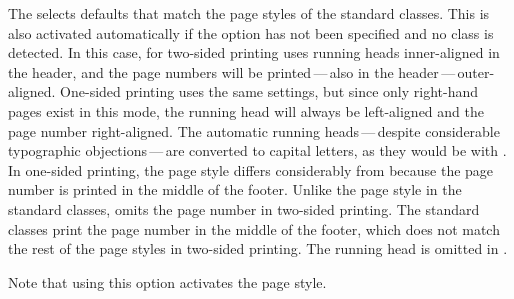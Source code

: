 The 
selects defaults that match the page styles of the standard
classes. This is also activated automatically if the option has not been
specified and no \KOMAScript{} class is detected. In this case, for two-sided
printing  uses running heads
inner-aligned in the header, and the page numbers will be printed\,---\,also
in the header\,---\,outer-aligned. One-sided printing uses the same settings,
but since only right-hand pages exist in this mode, the running head will
always be left-aligned and the page number right-aligned. The automatic
running heads\,---\,despite considerable typographic objections\,---\,are
converted to capital letters, as they would be with
%
. In one-sided
printing, the  page style
differs considerably from  because
the page number is printed in the middle of the footer.
Unlike the  page
style in the standard classes,
 omits the page number in
two-sided printing. The standard classes print the page number in the middle
of the footer, which does not match the rest of the page styles in two-sided
printing.
\iffalse %
  If you want the page number back
\begin{lstcode}
  \cfoot[\pagemark]{}
\end{lstcode}
  will restore it. %
\fi%
The running head is omitted in .

Note that using this option activates the
%
 page style.
\iffalse%
  This also applies if you use the option within the document.%
\fi
%
\EndIndexGroup



